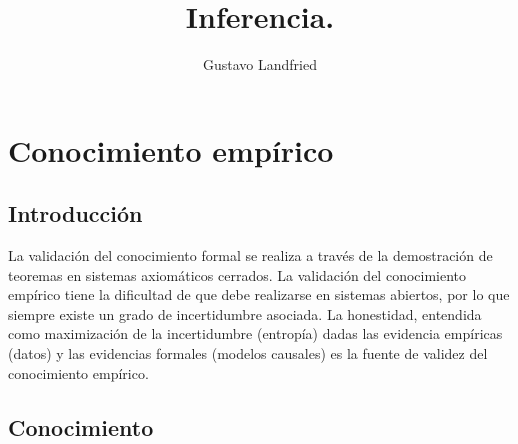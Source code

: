 \documentclass[a4paper,10pt]{book}
\title{\huge Inferencia.}
\author{Gustavo Landfried}
\newif\ifen
\newif\ifes
\newcommand{\en}[1]{\ifen#1\fi}
\newcommand{\es}[1]{\ifes#1\fi}
\begin{document}
\maketitle

\tableofcontents

\chapter{Conocimiento empírico}


\section{Introducción}


\en{}%
\es{La ciencia es una institución humana que tiene pretensión de verdad, esto es de formular proposiciones que tengan validez universal.}%
%
La validación del conocimiento formal se realiza a través de la demostración de teoremas en sistemas axiomáticos cerrados.
%
La validación del conocimiento empírico tiene la dificultad de que debe realizarse en sistemas abiertos, por lo que siempre existe un grado de incertidumbre asociada.
%
La honestidad, entendida como maximización de la incertidumbre (entropía) dadas las evidencia empíricas (datos) y las evidencias formales (modelos causales) es la fuente de validez del conocimiento empírico.



\section{Conocimiento}

\es{En algún momento hace aproximadamente 4500 millones de años, apareció en la tierra una forma de organización de la materia capaz de auto-replicarse.}%
%
\en{A lineage growth is a multiplicative and noisy process, a sequence of survival and reproductive probabilities.}%
\es{El crecimiento de un linaje es un proceso multiplicativo y ruidoso, una secuencia de probabilidades de supervivencia y reproducción.}%
%
\es{Los errores producidos durante la replicación diversifican las formas de organización de la materia, y las diferentes tazas de superviencia favorecen a aquellas formas que están mejor adaptas al medio.}%
%
\es{La vida puede ser vista como un sistema distribuido de procesamiento de información, y las diversas formas que adquiere la vida puede ser visto como conocimiento.}%

\end{document}
